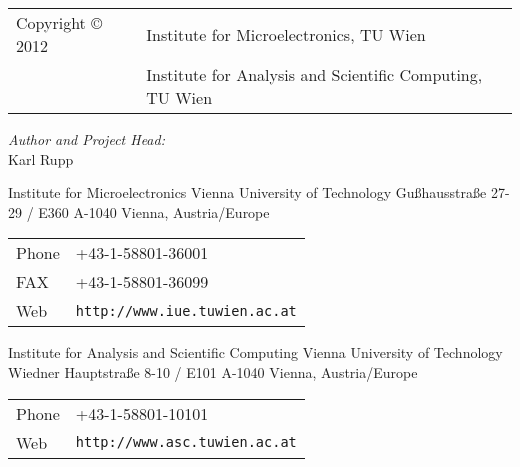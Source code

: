 
\clearpage

\begin{tabular}{ll}
Copyright {\copyright} 2012 & Institute for Microelectronics, TU Wien\\
                            & Institute for Analysis and Scientific Computing, TU Wien
\end{tabular}

\vspace{6.5cm}

\textit{Author and Project Head:}\\

Karl Rupp\\

\vspace{1cm}


\vspace{3.0cm}

Institute for Microelectronics\newline
Vienna University of Technology\newline
Gu\ss hausstra\ss e 27-29 / E360\newline
A-1040 Vienna, Austria/Europe\newline

\begin{tabular}{ll}
Phone  & +43-1-58801-36001\\
FAX    & +43-1-58801-36099\\
Web    & \texttt{http://www.iue.tuwien.ac.at}
\end{tabular}

\vspace{1.5cm}

Institute for Analysis and Scientific Computing\newline
Vienna University of Technology\newline
Wiedner Hauptstra\ss e 8-10 / E101\newline
A-1040 Vienna, Austria/Europe\newline

\begin{tabular}{ll}
Phone  & +43-1-58801-10101\\
Web    & \texttt{http://www.asc.tuwien.ac.at}
\end{tabular}




